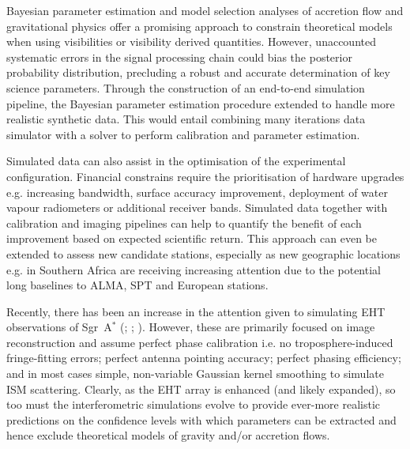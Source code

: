Bayesian parameter estimation and model selection analyses of accretion flow \citep[e.g.][]{Broderick_2016} and gravitational physics \citep[e.g.][]{Broderick_2014, Psaltis_2016} offer a promising approach to constrain theoretical models when using visibilities or visibility derived quantities. However, unaccounted systematic errors in the signal processing chain could bias  the posterior probability distribution, precluding a robust and accurate determination of key science parameters. Through the construction of an end-to-end simulation pipeline, the Bayesian parameter estimation procedure extended to handle more realistic synthetic data. This would entail combining many iterations data simulator with a solver to perform calibration and parameter estimation. %

Simulated data can also assist in the optimisation of the experimental configuration. Financial constrains require the prioritisation of hardware upgrades e.g. increasing bandwidth, surface accuracy improvement, deployment of water vapour radiometers or additional receiver bands. Simulated data together with calibration and imaging pipelines can help to quantify the benefit of each improvement based on expected scientific return. This approach can even be extended to assess new candidate stations, especially as new geographic locations e.g. in Southern Africa are receiving increasing attention due to the potential long baselines to ALMA, SPT and European stations.

Recently, there has been an increase in the attention given to simulating EHT observations of Sgr~A$^*$ (\citealt{Fish_2014}; \citealt{Lu_2014}; \citealt{2015arXiv151201413B}). However, these are primarily focused on image reconstruction and assume perfect phase calibration i.e. no troposphere-induced fringe-fitting errors; perfect antenna pointing accuracy; perfect phasing efficiency; and in most cases simple, non-variable Gaussian kernel smoothing to simulate ISM scattering. Clearly, as the EHT array is enhanced (and likely expanded), so too must the interferometric simulations evolve to provide ever-more realistic predictions on the confidence levels with which parameters can be extracted and hence exclude theoretical models of gravity and/or accretion flows.


